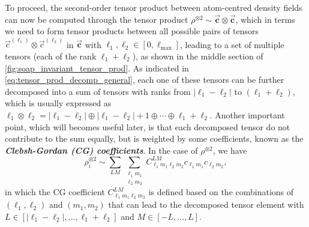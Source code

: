 \begin{myquote}
\vspace{10pt}

\hspace{10pt} To proceed, the second-order tensor product between atom-centred density fields can now be computed through the tensor product $\rho^{\otimes 2}\sim\vec{\bm{c}}\otimes\vec{\bm{c}}$, which in terms we need to form tensor products between all possible pairs of tensors $\vec{c}^{(\ell_1)}\otimes\vec{c}^{(\ell_2)}$ in $\vec{\bm{c}}$ with $\ell_1,\ell_2\in[0,\ell_{\max}]$, leading to a set of multiple tensors (each of the rank $\ell_1+\ell_2$), as shown in the middle section of \cref{fig:soap_invariant_tensor_prod}. As indicated in \cref{eq:tensor_prod_decomp_general}, each one of these tensors can be further decomposed into a sum of tensors with ranks from $|\ell_1-\ell_2|$ to $(\ell_1+\ell_2)$, which is usually expressed as $\ell_1\otimes\ell_2=|\ell_1-\ell_2|\oplus|\ell_1-\ell_2|+1\oplus\cdots\oplus \ell_1+\ell_2$.  Another important point, which will becomes useful later, is that each decomposed tensor do not contribute to the sum equally, but is weighted by some coefficients, known as the \textbf{\textit{Clebsh-Gordan (CG) coefficients}}. In the case of $\rho^{\otimes 2}$, we have
\begin{equation}
    \label{eq:CG_decomposition}
    \rho^{\otimes 2}_i\sim\sum_{LM}\sum_{\substack{\ell_1 m_1\\ \ell_2 m_2}}C^{LM}_{\ell_1 m_1\ell_2 m_2}c_{\ell_1 m_1}c_{\ell_2 m_2},
\end{equation}
in which the CG coefficient $C^{LM}_{\ell_1 m_1\ell_2 m_2}$ is defined based on the combinations of $(\ell_1,\ell_2)$ and $(m_1,m_2)$ that can lead to the decomposed tensor element with $L\in[|\ell_1-\ell_2|,\ldots,\ell_1+\ell_2]$ and $M\in[-L,\ldots,L]$.


\end{myquote}
